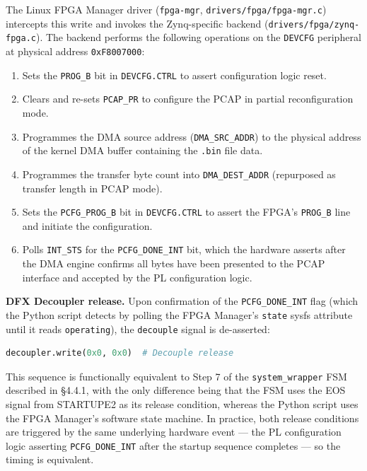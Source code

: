 The Linux FPGA Manager driver (\texttt{fpga-mgr}, \texttt{drivers/fpga/fpga-mgr.c}) intercepts this write and invokes the Zynq-specific backend (\texttt{drivers/fpga/zynq-fpga.c}). The backend performs the following operations on the \texttt{DEVCFG} peripheral at physical address \texttt{0xF8007000}:

\begin{enumerate}
  \item Sets the \texttt{PROG\_B} bit in \texttt{DEVCFG.CTRL} to assert configuration logic reset.
  \item Clears and re-sets \texttt{PCAP\_PR} to configure the PCAP in partial reconfiguration mode.
  \item Programmes the DMA source address (\texttt{DMA\_SRC\_ADDR}) to the physical address of the kernel DMA buffer containing the \texttt{.bin} file data.
  \item Programmes the transfer byte count into \texttt{DMA\_DEST\_ADDR} (repurposed as transfer length in PCAP mode).
  \item Sets the \texttt{PCFG\_PROG\_B} bit in \texttt{DEVCFG.CTRL} to assert the FPGA's \texttt{PROG\_B} line and initiate the configuration.
  \item Polls \texttt{INT\_STS} for the \texttt{PCFG\_DONE\_INT} bit, which the hardware asserts after the DMA engine confirms all bytes have been presented to the PCAP interface and accepted by the PL configuration logic.
\end{enumerate}
\textbf{DFX Decoupler release.} Upon confirmation of the \texttt{PCFG\_DONE\_INT} flag (which the Python script detects by polling the FPGA Manager's \texttt{state} sysfs attribute until it reads \texttt{operating}), the \texttt{decouple} signal is de-asserted:

\begin{lstlisting}[style=mystyle, language=Python]
decoupler.write(0x0, 0x0)  # Decouple release
\end{lstlisting}

This sequence is functionally equivalent to Step 7 of the \texttt{system\_wrapper} FSM described in §4.4.1, with the only difference being that the FSM uses the EOS signal from STARTUPE2 as its release condition, whereas the Python script uses the FPGA Manager's software state machine. In practice, both release conditions are triggered by the same underlying hardware event — the PL configuration logic asserting \texttt{PCFG\_DONE\_INT} after the startup sequence completes — so the timing is equivalent.

